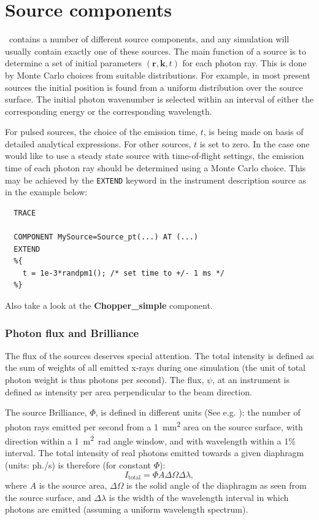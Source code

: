 
\chapter{Source components}
\label{c:source}

\MCX\ contains a number of different source components,
and any simulation will usually contain exactly one of these sources.
The main function of a source is to determine a set of initial
parameters $(\mathbf{r}, \mathbf{k}, t)$
for each photon ray. This is done by Monte Carlo choices from
suitable distributions. For example, in most present sources
the initial position is
found from a uniform distribution over the source surface.
The initial photon wavenumber
is selected within an interval of either the corresponding energy or the corresponding wavelength.

For pulsed sources, the choice of the emission time, $t$,
is being made on basis of detailed analytical expressions.
For other sources, $t$ is set to zero.
In the case one would like to use a steady state source
with time-of-flight settings,
the emission time of each photon ray should be determined using
a Monte Carlo choice. This may be achieved by
the \verb+EXTEND+ keyword in the instrument description source
as in the example below:

\begin{verbatim}
  TRACE

  COMPONENT MySource=Source_pt(...) AT (...)
  EXTEND
  %{
    t = 1e-3*randpm1(); /* set time to +/- 1 ms */
  %}
\end{verbatim}
Also take a look at the \textbf{Chopper\_simple} component.

\subsection{Photon flux and Brilliance}
\label{s:xray-flux}
The flux of the sources deserves special attention. The total
intensity is defined as the sum of weights of all emitted x-rays
during one simulation
(the unit of total photon weight is thus photons per second).
The flux, $\psi$, at an instrument is defined as intensity per area perpendicular
to the beam direction.

The source Brilliance, $\Phi$, is defined in different units (See e.g. \cite{als2011elements}):
the number of photon rays emitted per second from a
\SI{1}{\square mm} area on the source surface,
with direction within a 1~\si{\square m \radian} angle window,
and with wavelength within a 1\% interval.
The total intensity of real photons emitted towards a given diaphragm
(units: ph./s) is therefore (for constant $\Phi$):
\begin{equation}
I_\mathrm{total} = \Phi A \Delta\Omega \Delta\lambda ,
\end{equation}
where $A$ is the source area, $\Delta\Omega$ is the solid angle of the
diaphragm as seen from the source surface, and $\Delta\lambda$ is the
width of the wavelength interval in which photons are emitted (assuming
a uniform wavelength spectrum).

